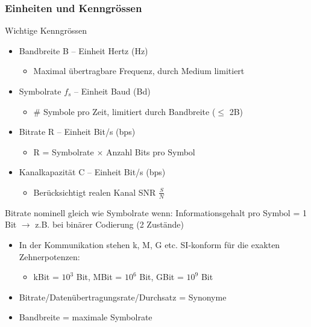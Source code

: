 \subsubsection*{Einheiten und Kenngrössen}

\begin{KR}{Wichtige Kenngrössen}
    \begin{itemize}
        \item Bandbreite B – Einheit Hertz (Hz)
        \begin{itemize}
            \item Maximal übertragbare Frequenz, durch Medium limitiert
        \end{itemize}
        \item Symbolrate $f_s$ – Einheit Baud (Bd)
        \begin{itemize}
            \item \# Symbole pro Zeit, limitiert durch Bandbreite ($\leq$ 2B)
        \end{itemize}
        \item Bitrate R – Einheit Bit/s (bps)
        \begin{itemize}
            \item R = Symbolrate $\times$ Anzahl Bits pro Symbol
        \end{itemize}
        \item Kanalkapazität C – Einheit Bit/s (bps)
        \begin{itemize}
            \item Berücksichtigt realen Kanal SNR $\frac{S}{N}$
        \end{itemize}
    \end{itemize}
\end{KR}

\begin{remark}
    Bitrate nominell gleich wie Symbolrate wenn: Informationsgehalt pro Symbol = 1 Bit $\rightarrow$
    z.B. bei binärer Codierung (2 Zustände)
\end{remark}

\begin{remark}
    \begin{itemize}
        \item In der Kommunikation stehen k, M, G etc. SI-konform für die exakten Zehnerpotenzen:
        \begin{itemize}
            \item kBit = $10^3$ Bit, MBit = $10^6$ Bit, GBit = $10^9$ Bit
        \end{itemize}
        \item Bitrate/Datenübertragungsrate/Durchsatz = Synonyme
        \item Bandbreite = maximale Symbolrate
    \end{itemize}
\end{remark}

